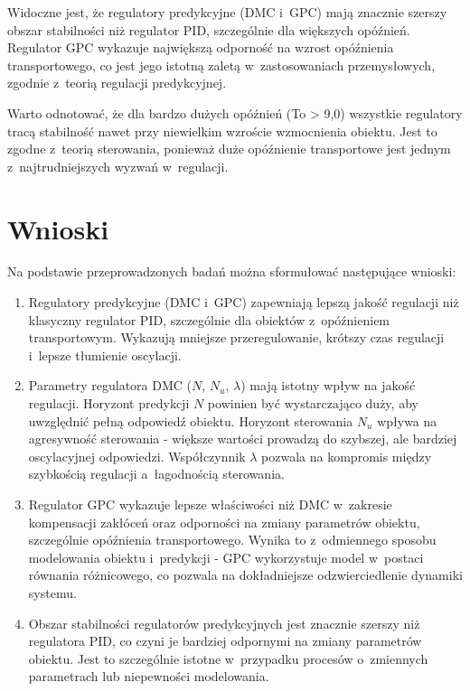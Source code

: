 \documentclass[a4paper,titlepage,11pt,floatssmall]{mwrep}
\begin{document}
Widoczne jest, że regulatory predykcyjne (DMC i~GPC) mają znacznie szerszy obszar stabilności niż regulator PID, szczególnie dla większych opóźnień. Regulator GPC wykazuje największą odporność na wzrost opóźnienia transportowego, co jest jego istotną zaletą w~zastosowaniach przemysłowych, zgodnie z~teorią regulacji predykcyjnej.

Warto odnotować, że dla bardzo dużych opóźnień (To > 9,0) wszystkie regulatory tracą stabilność nawet przy niewielkim wzroście wzmocnienia obiektu. Jest to zgodne z~teorią sterowania, ponieważ duże opóźnienie transportowe jest jednym z~najtrudniejszych wyzwań w~regulacji.

\chapter{Wnioski}

Na podstawie przeprowadzonych badań można sformułować następujące wnioski:

\begin{enumerate}
    \item Regulatory predykcyjne (DMC i~GPC) zapewniają lepszą jakość regulacji niż klasyczny regulator PID, szczególnie dla obiektów z~opóźnieniem transportowym. Wykazują mniejsze przeregulowanie, krótszy czas regulacji i~lepsze tłumienie oscylacji.

    \item Parametry regulatora DMC ($N$, $N_u$, $\lambda$) mają istotny wpływ na jakość regulacji. Horyzont predykcji $N$ powinien być wystarczająco duży, aby uwzględnić pełną odpowiedź obiektu. Horyzont sterowania $N_u$ wpływa na agresywność sterowania - większe wartości prowadzą do szybszej, ale bardziej oscylacyjnej odpowiedzi. Współczynnik $\lambda$ pozwala na kompromis między szybkością regulacji a~łagodnością sterowania.

    \item Regulator GPC wykazuje lepsze właściwości niż DMC w~zakresie kompensacji zakłóceń oraz odporności na zmiany parametrów obiektu, szczególnie opóźnienia transportowego. Wynika to z~odmiennego sposobu modelowania obiektu i~predykcji - GPC wykorzystuje model w~postaci równania różnicowego, co pozwala na dokładniejsze odzwierciedlenie dynamiki systemu.

    \item Obszar stabilności regulatorów predykcyjnych jest znacznie szerszy niż regulatora PID, co czyni je bardziej odpornymi na zmiany parametrów obiektu. Jest to szczególnie istotne w~przypadku procesów o~zmiennych parametrach lub niepewności modelowania.
\end{enumerate}
\end{document}
